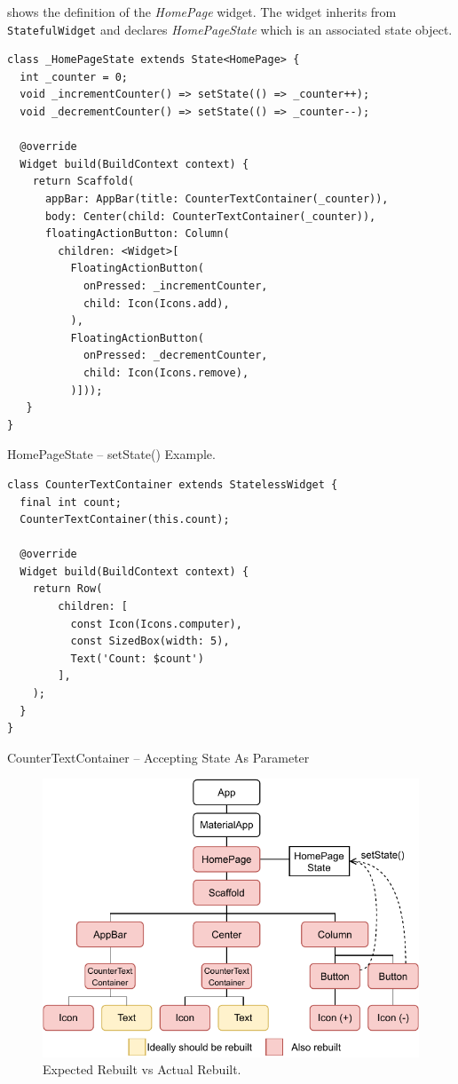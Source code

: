  shows the definition of the \textit{HomePage} widget. The widget inherits from \verb|StatefulWidget| and declares \textit{HomePageState} which is an associated state object.

\begin{listing}[ht]
\begin{verbatim}
class _HomePageState extends State<HomePage> {
  int _counter = 0;
  void _incrementCounter() => setState(() => _counter++);
  void _decrementCounter() => setState(() => _counter--);

  @override
  Widget build(BuildContext context) {
    return Scaffold(
      appBar: AppBar(title: CounterTextContainer(_counter)),
      body: Center(child: CounterTextContainer(_counter)),
      floatingActionButton: Column(
        children: <Widget>[
          FloatingActionButton(
            onPressed: _incrementCounter,
            child: Icon(Icons.add),
          ),
          FloatingActionButton(
            onPressed: _decrementCounter,
            child: Icon(Icons.remove),
          )]));
   }
}
\end{verbatim}
\caption{HomePageState -- setState() Example.}
\label{listing:counter-base-state-homepage}
\end{listing}

\begin{listing}[ht]
\begin{verbatim}
class CounterTextContainer extends StatelessWidget {
  final int count;
  CounterTextContainer(this.count);
  
  @override
  Widget build(BuildContext context) {
    return Row(
        children: [
          const Icon(Icons.computer),
          const SizedBox(width: 5),
          Text('Count: $count')
        ],
    );
  }
}
\end{verbatim}
\caption{CounterTextContainer -- Accepting State As Parameter}
\label{listing:counter-base-text-container}
\end{listing}

\begin{figure}[htp]
    \centering
    \includegraphics[width=0.75\linewidth]{img/flutter/counter-base-setState.pdf}
    \caption{Expected Rebuilt vs Actual Rebuilt.}
    \label{fig:counter-app-base-build}
\end{figure}

